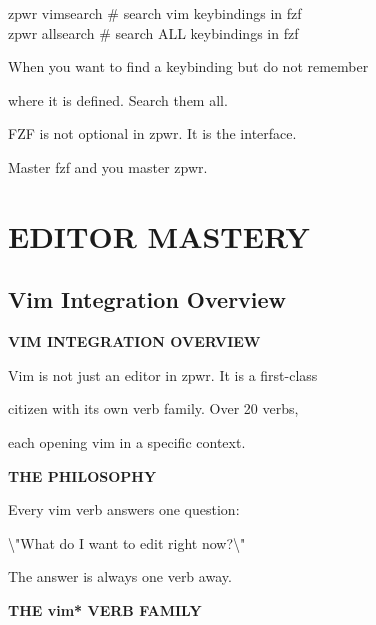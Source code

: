 \documentclass[11pt,a4paper,twoside]{book}
\begin{document}
\begin{codebox}
zpwr vimsearch          \# search vim keybindings in fzf\\
zpwr allsearch          \# search ALL keybindings in fzf\\
\end{codebox}

When you want to find a keybinding but do not remember

where it is defined. Search them all.

FZF is not optional in zpwr. It is the interface.

Master fzf and you master zpwr.


\vspace{16pt}


\chapter{EDITOR MASTERY}

\section{Vim Integration Overview}


\vspace{10pt}
{\large\bfseries\color{neoncyan} VIM INTEGRATION OVERVIEW}\vspace{6pt}

\begin{codebox}
Vim is not just an editor in zpwr. It is a first-class\\
\end{codebox}

citizen with its own verb family. Over 20 verbs,

\begin{codebox}
each opening vim in a specific context.\\
\end{codebox}


\vspace{12pt}
{\bfseries\color{neonyellow} THE PHILOSOPHY}\vspace{4pt}

Every vim verb answers one question:

\textbackslash{}"What do I want to edit right now?\textbackslash{}"

The answer is always one verb away.


\vspace{12pt}
{\bfseries\color{neonyellow} THE vim* VERB FAMILY}\vspace{4pt}
\end{document}
